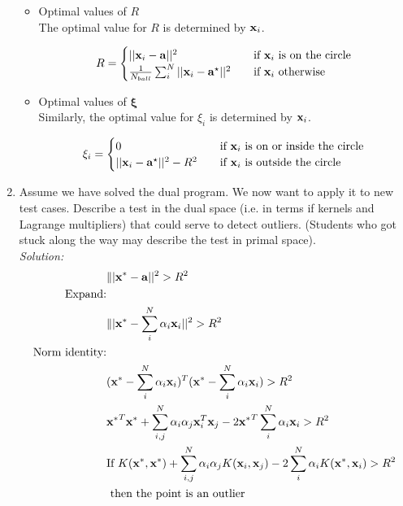 \documentclass[12pt,a4paper]{article}
\newcommand{\xscalar}{x}
\newcommand{\xvec}{{\bf \xscalar}}
\newcommand{\avec}{\mathbf{a}}
\begin{document}
\begin{enumerate}
\begin{itemize}
			\item Optimal values of $R$ \\
				The optimal value for $R$ is determined by $\xvec_i$.
				
				\begin{equation*}
				R = \begin{cases}
				||\xvec_i - \avec||^2 & \quad \text{if } \xvec_i \text{ is on the circle}\\
				\frac{1}{N_{ball}}\sum_i^N ||\xvec_i - \avec^\star||^2  & \quad \text{if } \xvec_i \text{ otherwise}\\
				\end{cases}
				\end{equation*}
			
			\item Optimal values of $\boldsymbol{\xi}$ \\
				Similarly, the optimal value for $\xi_i$ is determined by $\xvec_i$.
				
				\begin{equation*}
				\xi_i = \begin{cases}
				0      & \quad \text{if } \xvec_i \text{ is on or inside the circle}\\
				||\xvec_i - \avec^\star||^2 - R^2  & \quad \text{if } \xvec_i \text{ is outside the circle}\\
				\end{cases}
				\end{equation*}
		\end{itemize}


\item Assume we have solved the dual program. We now want to apply it to new test cases. Describe a test in the dual space (i.e. in terms if kernels and Lagrange multipliers) that could serve to detect outliers. (Students who got stuck along the way may describe the test in primal space). \\
\emph{Solution:} \\
\begin{align*}
&\||\xvec^* - \avec||^2 > R^2 \\
\text{Expand:} \\
&\||\xvec^* - \sum_i^N \alpha_i \xvec_i||^2 > R^2 \\
\text{Norm identity:} \\
&(\xvec^* - \sum_i^N \alpha_i \xvec_i)^T(\xvec^* - \sum_i^N \alpha_i \xvec_i) > R^2 \\
&{\xvec^*}^T\xvec^* + \sum_{i,j}^N \alpha_i \alpha_j \xvec_i^T \xvec_j - 2 {\xvec^*}^T \sum_i^N \alpha_i \xvec_i > R^2 \\
&\text{If } K(\xvec^*, \xvec^*) + \sum_{i,j}^N \alpha_i \alpha_j K(\xvec_i, \xvec_j) - 2 \sum_i^N \alpha_i K(\xvec^*, \xvec_i) > R^2 \\
&\text{  then the point is an outlier} \\
\end{align*}


\end{enumerate}
\end{document}
